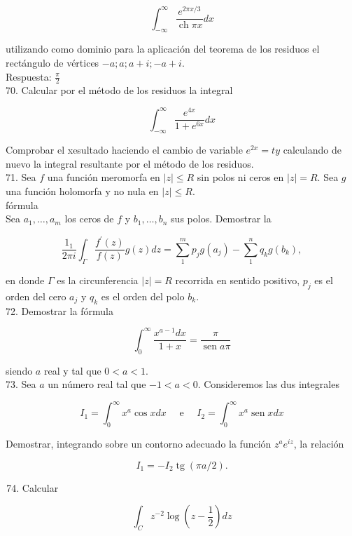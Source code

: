 \documentclass[10pt]{article}
\theoremstyle{plain}
\theoremstyle{definition}
\theoremstyle{remark}
\begin{document}
$$
\int_{-\infty}^{\infty} \frac{e^{2 \pi x / 3}}{\operatorname{ch} \pi x} d x
$$

utilizando como dominio para la aplicación del teorema de los residuos el rectángulo de vértices $-a ; a ; a+i ;-a+i$.\\
Respuesta: $\frac{\pi}{2}$\\
70. Calcular por el método de los residuos la integral

$$
\int_{-\infty}^{\infty} \frac{e^{4 x}}{1+e^{6 x}} d x
$$

Comprobar el xesultado haciendo el cambio de variable $e^{2 x}=t y$ calculando de nuevo la integral resultante por el método de los residuos.\\
71. Sea $f$ una función meromorfa en $|z| \leqslant R$ sin polos ni ceros en $|z|=R$. Sea $g$ una función holomorfa y no nula en $|z| \leqslant R$.\\
fórmula\\
Sea $a_{1}, \ldots, a_{m}$ los ceros de $f$ y $b_{1}, \ldots, b_{n}$ sus polos. Demostrar la

$$
\frac{1_{1}}{2 \pi i} \int_{\Gamma} \frac{f^{\prime}(z)}{f(z)} g(z) d z=\sum_{1}^{m} p_{j} g\left(a_{j}\right)-\sum_{1}^{n} q_{k} g\left(b_{k}\right),
$$

en donde $\Gamma$ es la circunferencia $|z|=R$ recorrida en sentido positivo, $p_{j}$ es el orden del cero $a_{j}$ y $q_{k}$ es el orden del polo $b_{k}$.\\
72. Demostrar la fórmula

$$
\int_{0}^{\infty} \frac{x^{a-1} d x}{1+x}=\frac{\pi}{\operatorname{sen} a \pi}
$$

siendo $a$ real y tal que $0<a<1$.\\
73. Sea $a$ un número real tal que $-1<a<0$. Consideremos las dus integrales

$$
I_{1}=\int_{0}^{\infty} x^{a} \cos x d x \quad \text { e } \quad I_{2}=\int_{0}^{\infty} x^{a} \operatorname{sen} x d x
$$

Demostrar, integrando sobre un contorno adecuado la función $z^{a} e^{i z}$, la relación

$$
I_{1}=-I_{2} \operatorname{tg}(\pi a / 2) .
$$

\begin{enumerate}
  \setcounter{enumi}{73}
  \item Calcular
\end{enumerate}

$$
\int_{C} z^{-2} \log \left(z-\frac{1}{2}\right) d z
$$
\end{document}
